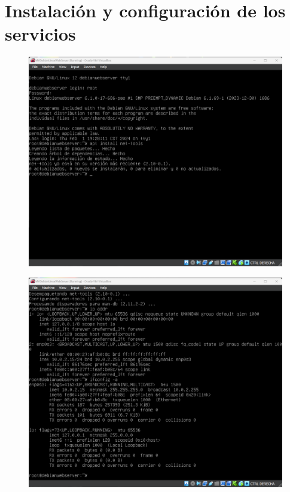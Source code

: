 \documentclass[12pt,a4paper]{article}
\begin{document}
\section{Instalación y configuración de los servicios}

\begin{figure}[H]
    \centering
    \includegraphics[width=1\linewidth]{M3_Virtualización_y_Contenedores/Tarea_2_Máquina_Virtual_Local/reporte/figuras/4-1_Configuración_servicios.png}
    \label{fig:Configuración_serivicios_1}
\end{figure}


\begin{figure}[H]
    \centering
    \includegraphics[width=1\linewidth]{M3_Virtualización_y_Contenedores/Tarea_2_Máquina_Virtual_Local/reporte/figuras/4-2_Configuración_servicios.png}
    \label{fig:Configuración_serivicios_2}
\end{figure}
\end{document}
